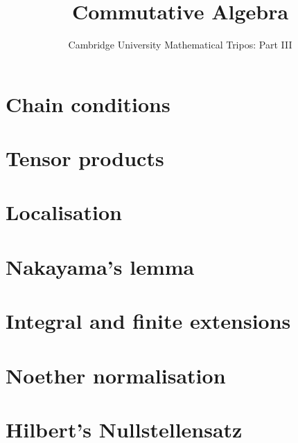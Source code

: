 \documentclass{article}
\title{Commutative Algebra}
\author{Cambridge University Mathematical Tripos: Part III}
\begin{document}
\maketitle

\tableofcontentsnewpage{}

\section{Chain conditions}

\section{Tensor products}

\section{Localisation}

\section{Nakayama's lemma}

\section{Integral and finite extensions}

\section{Noether normalisation}

\section{Hilbert's Nullstellensatz}

\end{document}
